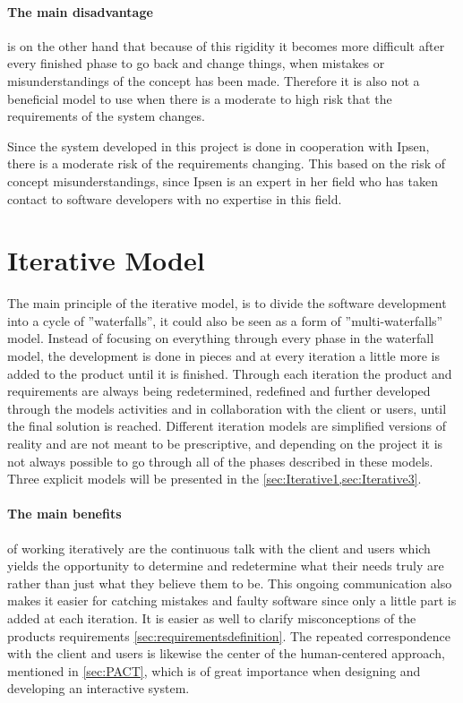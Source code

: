 \paragraph{The main disadvantage} is on the other hand that because of this rigidity it becomes more difficult after every finished phase to go back and change things, when mistakes or misunderstandings of the concept has been made.
Therefore it is also not a beneficial model to use when there is a moderate to high risk that the requirements of the system changes.

Since the system developed in this project is done in cooperation with Ipsen, there is a moderate risk of the requirements changing.
This based on the risk of concept misunderstandings, since Ipsen is an expert in her field who has taken contact to software developers with no expertise in this field.

\section{Iterative Model} \label{sec:iterativModel}
The main principle of the iterative model, \cite{Iterative-Toolsqa,InteractionDesign} is to divide the software development into a cycle of ''waterfalls'', it could also be seen as a form of ''multi-waterfalls'' model.
Instead of focusing on everything through every phase in the waterfall model, the development is done in pieces and at every iteration a little more is added to the product until it is finished.
Through each iteration the product and requirements are always being redetermined, redefined and further developed through the models activities and in collaboration with the client or users, until the final solution is reached.
Different iteration models are simplified versions of reality and are not meant to be prescriptive, and depending on the project it is not always possible to go through all of the phases described in these models. 
Three explicit models will be presented in the \cref{sec:Iterative1,sec:Iterative3}.


\paragraph{The main benefits}
of working iteratively are the continuous talk with the client and users which yields the opportunity to determine and redetermine what their needs truly are rather than just what they believe them to be.
This ongoing communication also makes it easier for catching mistakes and faulty software since only a little part is added at each iteration.
It is easier as well to clarify misconceptions of the products requirements \cref{sec:requirementsdefinition}.
The repeated correspondence with the client and users is likewise the center of the human-centered approach, mentioned in \cref{sec:PACT}, which is of great importance when designing and developing an interactive system.

